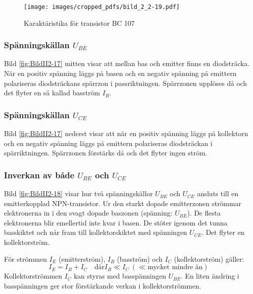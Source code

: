 \begin{figure*}[p]
  \begin{center}
    \texttt{[image: images/cropped\_pdfs/bild\_2\_2-19.pdf]}
    \caption{Karaktäristika för transistor BC 107}
    \label{fig:BildII2-19}
  \end{center}
\end{figure*}


\subsubsection{Spänningskällan \(U_{BE}\)}

Bild \ref{fig:BildII2-17} mitten visar att mellan bas och emitter finns en diodsträcka.
När en positiv spänning läggs på basen och en negativ spänning på emittern polariseras diodsträckans spärrzon i passriktningen.
Spärrzonen upplöses då och det flyter en så kallad basström \(I_B\).

\subsubsection{Spänningskällan \(U_{CE}\)}

Bild \ref{fig:BildII2-17} nederst visar att när en positiv spänning läggs på kollektorn och en negativ spänning läggs på emittern polariseras diodsträckan i spärriktningen.
Spärrzonen förstärks då och det flyter ingen ström.

\subsubsection{Inverkan av både \(U_{BE}\) och \(U_{CE}\)}

Bild \ref{fig:BildII2-18} visar hur två spänningskällor \(U_{BE}\) och
\(U_{CE}\) ansluts till en emitterkopplad NPN-transistor.
Ur den starkt dopade emitterzonen strömmar elektronerna in i den svagt dopade
baszonen (spänning: \(U_{BE}\)).
De flesta elektronerna blir emellertid inte kvar i basen.
De stöter igenom det tunna basskiktet och når fram till
kollektorskiktet med spänningen \(U_{CE}\). Det flyter en kollektorström.

För strömmen \(I_E\) (emitterström), \(I_B\) (basström) och \(I_C\)
(kollektorström) gäller:
\[I_E = I_B + I_C\quad \text{där} I_B \ll I_C\ (\ll \text{mycket mindre än})\]
Kollektorströmmen \(I_C\) kan styras med basspänningen \(U_{BE}\).
En liten ändring i basspänningen ger stor förstärkande verkan i
kollektorströmmen.

